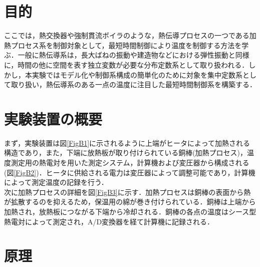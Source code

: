 \documentclass[12pt]{jsarticle}
\begin{document}
\setcounter{page}{1}

\section{目的}
ここでは，熱交換器や強制貫流ボイラのような，熱伝導プロセスの一つである加熱プロセス系を制御対象として，最短時間制御により温度を制御する方法を学ぶ．一般に熱伝導系は，長大ばねの振動や建造物などにおける弾性振動と同様に，時間の他に空間を表す独立変数が必要な分布定数系として取り扱われる．しかし，本実験ではモデル化や制御系構成の簡単化のために対象を集中定数系として取り扱い，熱伝導系のある一点の温度に注目した最短時間制御系を構築する．
\section{実験装置の概要}
まず，実験装置は図\ref{FigB1}に示されるように上端がヒータによって加熱される構造であり，また，下端に放熱板が取り付けられている銅棒(加熱プロセス)，温度測定用の熱電対を用いた測定システム，計算機および変圧器から構成される(図\ref{FigB2})．ヒータに供給される電力は変圧器によって調整可能であり，計算機によって測定温度の記録を行う．\\
  次に加熱プロセスの詳細を図\ref{FigB3}に示す．加熱プロセスは銅棒の表面から熱が拡散するのを抑えるため，保温用の綿が巻き付けられている．銅棒は上端から加熱され，放熱板につながる下端から冷却される．銅棒の各点の温度はシース型熱電対によって測定され，A/D変換器を経て計算機に記録される．
\section{原理}
\end{document}
